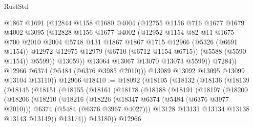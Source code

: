 \begin{lexlean}{RustStd}
\begin{coremodule}
                  @1867
                  @1691
                  (@12844
                    @1158
                    @1680
                    @4004
                    (@12755
                      @1156
                      @716
                      @1677
                      @1679
                      @4002
                      @3095
                      (@12828
                        @1156
                        @1677
                        @4002
                        (@12952
                          @1154
                          @82
                          @11
                          @1675
                          @700
                          @2010
                          @2004
                          @5748
                          @131
                          @1867
                          @1867
                          @1715
                          @12966
                          (@5326 (@6691 @1154))
                          @12972
                          @12975
                          @12979
                          (@6710 (@6712 @1154 @6715))
                          (@5588 (@5590 @1154))
                          @5599))
                      @13059))
                  @13064
                  @13067
                  @13070
                  @13073
                  @5599))
              @7284))
          @12966
          @6374
          (@5484 (@6376 @3985 @2010)))
        @13089
        @13092
        @13095
        @13099
        @13104
        @13110))
    @12966
@18410 := @18092
    (@18105
      (@18132
        (@18136
          (@18139
            (@18145
              (@18151
                (@18155
                  (@18161
                    (@18178
                      (@18188
                        (@18191
                          (@18197
                            (@18200
                              (@18206
                                (@18210
                                  (@18216
                                    (@18226
                                      (@18347 @6374 (@5484 (@6376 @3977 @2010)))
                                      @6374
                                      (@5484 (@6376 @3967 @4027)))
                                    @13128
                                    @13131
                                    @13134
                                    @13138
                                    @13143
                                    @13149))
                                @13174))
                            @13180))
                        @12966

\end{coremodule}
\end{lexlean}
